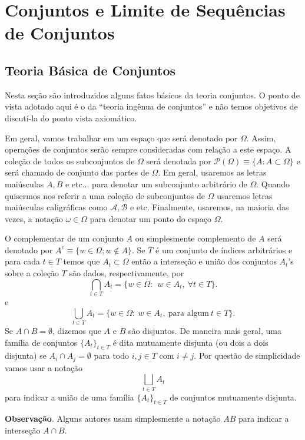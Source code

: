\chapter[Aula 1]{Conjuntos e Limite de Sequências de Conjuntos}
\chaptermark{}

  
\section{Teoria Básica de Conjuntos}

Nesta seção são introduzidos alguns fatos básicos da teoria
conjuntos. O ponto de vista adotado aqui é o da 
``teoria ingênua de conjuntos'' e não temos objetivos de discutí-la do ponto 
vista axiomático.


Em geral, vamos trabalhar em um espaço que será denotado 
por $\Omega$. Assim, operações de conjuntos serão sempre 
consideradas com relação a este espaço. 
A coleção de todos os subconjuntos de $\Omega$ será 
denotada por $\mathcal{P}(\Omega)\equiv \{A: A\subset \Omega\}$ e 
será chamado de conjunto das partes de $\Omega$.
Em geral, usaremos as letras maiúsculas $A,B$ e etc$\ldots$ para denotar
um subconjunto arbitrário de $\Omega$. Quando quisermos nos referir
a uma coleção de subconjuntos de $\Omega$ usaremos letras maiúsculas 
caligráficas como $\mathcal{A}, \mathcal{B}$ e etc. Finalmente,
usaremos, na maioria das vezes, a notação $\omega\in\Omega$ 
para denotar um ponto do espaço $\Omega$.



O complementar de um conjunto $A$ ou simplesmente complemento de $A$ 
será denotado por $A^{c}\equiv \{w \in \Omega; w \notin A\}$. 
Se $T$ é um conjunto de índices arbitrários e 
para cada $t\in T$ temos que $A_t\subset \Omega$ então 
a interseção e união dos conjuntos $A_t$'s sobre a coleção
$T$ são dados, respectivamente, por 
\[ 
\bigcap_{t \in T}{A_t}
= 
\{ w \in \Omega:\  \ w \in A_t,\ \forall t \in T\}.
\]
e
\[
\bigcup_{t \in T}{A_t}
= 
\{ w \in \Omega:\ w \in A_t,\ \text{para algum}\ t \in T \}.
\]
%
%
%
Se $A \cap B = \emptyset$, dizemos que $A$ e $B$ são disjuntos.
De maneira mais geral, uma família de conjuntos 
$\{A_t\}_{t\in T}$ é dita mutuamente disjunta (ou dois a dois disjunta) 
se $A_i \cap A_j = \emptyset$ para todo $i,j\in T$ com $i\neq j$. 
Por questão de simplicidade vamos usar 
a notação 
\[
	\bigsqcup_{t \in T} A_t
\]
para indicar a união de uma 
família $\{A_t\}_{t\in T}$ de conjuntos
mutuamente disjunta.

\bigskip
\noindent
\textbf{Observação}. 
Alguns autores usam simplesmente a notação $AB$ 
para indicar a interseção $A\cap B$. 
\bigskip


